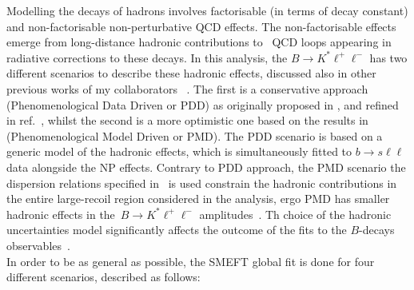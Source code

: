  Modelling the decays of hadrons involves factorisable (in terms of decay constant) and non-factorisable non-perturbative QCD effects. The non-factorisable effects emerge from long-distance hadronic contributions to~\cite{Khodjamirian:2010vf,Jager:2014rwa,Lyon:2014hpa} QCD loops appearing in radiative corrections to these decays. In this analysis, the  $B\to K^*\ell^+\ell^-$ has two different scenarios to describe these hadronic effects, discussed also in other previous works of my collaborators ~\cite{Ciuchini:2016weo,Ciuchini:2017mik,Ciuchini:2017gva,Ciuchini:2018xll,Ciuchini:2018anp,Ciuchini:2019usw}. The first is a conservative approach (Phenomenological Data Driven or PDD) as originally proposed in \cite{Ciuchini:2015qxb}, and refined in ref.~\cite{Ciuchini:2018anp}, whilst the second is a more optimistic one based on the results in~\cite{Khodjamirian:2010vf} (Phenomenological Model Driven or PMD). The PDD scenario is based on a generic model of the hadronic effects, which is simultaneously fitted to $b \to s \ell \ell$ data alongside the NP effects. Contrary to PDD approach, the PMD scenario the dispersion relations specified in~\cite{Khodjamirian:2010vf} is used constrain the hadronic contributions in the entire large-recoil region considered in the analysis, ergo PMD has smaller hadronic effects in the~$B\to K^*\ell^+\ell^-$ amplitudes~\cite{Ciuchini:2016weo}. Th choice of the hadronic uncertainties model significantly affects the outcome of the  fits to the $B$-decays observables~\cite{Ciuchini:2019usw}. \\ In order to be as general as possible, the SMEFT global fit is done for four different scenarios, described as follows:
